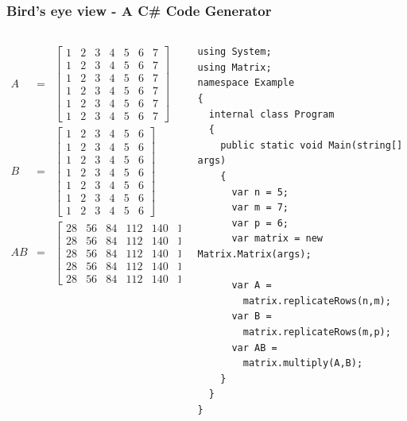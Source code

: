 \documentclass[10pt, compress]{beamer}
\begin{document}
\begin{frame}[fragile]
\frametitle{Bird's eye view - A C\# Code Generator}
  
\begin{columns}[T] %
\begin{column}{.48\textwidth}
  {\scriptsize
  \begin{align*}
    A &=& \begin{bmatrix}
      1 & 2 & 3 & 4 & 5 & 6 & 7 \\
      1 & 2 & 3 & 4 & 5 & 6 & 7 \\
      1 & 2 & 3 & 4 & 5 & 6 & 7 \\
      1 & 2 & 3 & 4 & 5 & 6 & 7 \\
      1 & 2 & 3 & 4 & 5 & 6 & 7 \\
      1 & 2 & 3 & 4 & 5 & 6 & 7
        \end{bmatrix} \\
    B &=& \begin{bmatrix}
      1 & 2 & 3 & 4 & 5 & 6 \\
      1 & 2 & 3 & 4 & 5 & 6 \\
      1 & 2 & 3 & 4 & 5 & 6 \\
      1 & 2 & 3 & 4 & 5 & 6 \\
      1 & 2 & 3 & 4 & 5 & 6 \\
      1 & 2 & 3 & 4 & 5 & 6 \\
      1 & 2 & 3 & 4 & 5 & 6
        \end{bmatrix} \\
    AB &=&
           \begin{bmatrix}
28 & 56 & 84 & 112 & 140 & 168 \\
28 & 56 & 84 & 112 & 140 & 168 \\
28 & 56 & 84 & 112 & 140 & 168 \\
28 & 56 & 84 & 112 & 140 & 168 \\
28 & 56 & 84 & 112 & 140 & 168
           \end{bmatrix}
  \end{align*}
  }%
\end{column}%
\hfill%
\pause
\begin{column}{.48\textwidth}
\begin{verbatim}
using System;
using Matrix;
namespace Example
{
  internal class Program
  {
    public static void Main(string[] args)
    {
      var n = 5;
      var m = 7;
      var p = 6;
      var matrix = new Matrix.Matrix(args);

      var A = 
        matrix.replicateRows(n,m);
      var B = 
        matrix.replicateRows(m,p);
      var AB = 
        matrix.multiply(A,B);
    }
  }
}
\end{verbatim}
\end{column}%
\end{columns}
\end{frame}
\end{document}
